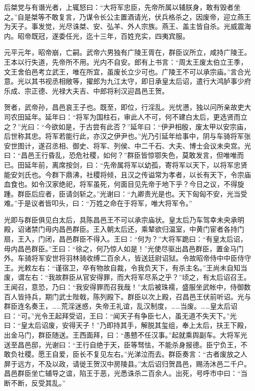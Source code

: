 \documentclass[UTF8,titlepage,oneside]{ctexbook}
\begin{document}
后桀党与有谮光者，上辄怒曰：“大将军忠臣，先帝所属以辅朕身，敢有毁者坐之。”自是桀等不敢复言，乃谋令长公主置酒请光，伏兵格杀之，因废帝，迎立燕王为天子。事发觉，光尽诛桀、安、弘羊、外人宗族。燕王、盖主皆自杀。光威震海内。昭帝既冠，遂委任光，迄十三年，百姓充实，四夷宾服。


元平元年，昭帝崩，亡嗣。武帝六男独有广陵王胥在，群臣议所立，咸持广陵王。王本以行失道，先帝所不用。光内不自安。郎有上书言：“周太王废太伯立王季，文王舍伯邑考立武王，唯在所宜，虽废长立少可也。广陵王不可以承宗庙。”言合光意。光以其书视丞相敞等，擢郎为九江太守，即日承皇太后诏，遣行大鸿胪事少府乐成、宗正德、光禄大夫吉、中郎将利汉迎昌邑王贺。


贺者，武帝孙，昌邑哀王子也。既至，即位，行淫乱。光忧懑，独以问所亲故吏大司农田延年。延年曰：“将军为国柱石，审此人不可，何不建白太后，更选贤而立之？”光曰：“今欲如是，于古尝有此否？”延年曰：“伊尹相殷，废太甲以安宗庙，后世称其忠。将军若能行此，亦汉之伊尹也。”光乃引延年给事中，阴与车骑将军张安世图计，遂召丞相、御史、将军、列侯、中二千石、大夫、博士会议未央宫。光曰：“昌邑王行昏乱，恐危社稷，如何？”群臣皆惊鄂失色，莫敢发言，但唯唯而已。田延年前，离席按剑，曰：“先帝属将军以幼孤，寄将军以天下，以将军忠贤能安刘氏也。今群下鼎沸，社稷将倾，且汉之传谥常为孝者，以长有天下，令宗庙血食也。如令汉家绝祀，将军虽死，何面目见先帝于地下乎？今日之议，不得旋踵。群臣后应者，臣请剑斩之。”光谢曰：“九卿责光是也。天下匈匈不安，光当受难。”于是议者皆叩头，曰：“万姓之命在于将军，唯大将军令。”


光即与群臣俱见白太后，具陈昌邑王不可以承宗庙状。皇太后乃车驾幸未央承明殿，诏诸禁门毋内昌邑群臣。王入朝太后还，乘辇欲归温室，中黄门宦者各持门扇，王入，门闭，昌邑群臣不得入。王曰：“何为？”大将军跪曰：“有皇太后诏，毋内昌邑群臣。”王曰：“徐之，何乃惊人如是！”光使尽驱出昌邑群臣，置金马门外。车骑将军安世将羽林骑收缚二百余人，皆送廷尉诏狱。令故昭帝侍中中臣侍守王。光敕左右：“谨宿卫，卒有物故自裁，令我负天下，有杀主名。”王尚未自知当废，谓左右：“我故群臣从官安得罪，而大将军尽系之乎？”顷之，有太后诏召王。王闻召，意恐，乃曰：“我安得罪而召我哉！”太后被珠襦，盛服坐武帐中，侍御数百人皆持兵，期门武士陛戟，陈列殿下。群臣以次上殿，召昌邑王伏前听诏。光与群臣连名奏王，……荒淫迷惑，失帝王礼谊，乱汉制度，……当废。……皇太后诏曰：“可。”光令王起拜受诏，王曰：“闻天子有争臣七人，虽无道不失天下。”光曰：“皇太后诏废，安得天子！”乃即持其手，解脱其玺组，奉上太后，扶王下殿，出金马门，群臣随送。王西面拜，曰：“愚戆不任汉事。”起就乘舆副车。大将军光送至昌邑邸，光谢曰：“王行自绝于天，臣等驽怯，不能杀身报德。臣宁负王，不敢负社稷。愿王自爱，臣长不复见左右。”光涕泣而去。群臣奏言：“古者废放之人屏于远方，不及以政，请徙王贺汉中房陵县。”太后诏归贺昌邑，赐汤沐邑二千户。昌邑群臣坐亡辅导之谊，陷王于恶，光悉诛杀二百余人。出死，号呼市中曰：“当断不断，反受其乱。”
\end{document}
